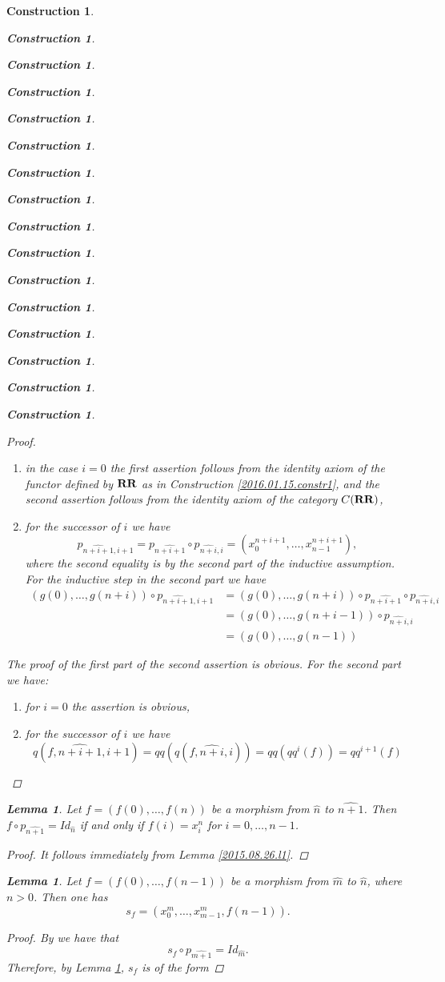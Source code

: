 \documentclass[onecolumn,12pt]{amsart}
\newtheorem{lemma}[proposition]{Lemma}
\numberwithin{proposition}{subsection}
\newtheorem{construction}[proposition]{Construction}
\newcommand{\wh}{\widehat}
\newcommand{\RR}{{\bf RR}}
\begin{document}
\begin{construction}
\begin{construction}
\begin{construction}
\begin{construction}
\begin{construction}
\begin{construction}
\begin{construction}
\begin{construction}
\begin{construction}
\begin{construction}
\begin{construction}
\begin{construction}
\begin{construction}
\begin{construction}
\begin{construction}
\begin{construction}
\begin{proof}
%
\begin{enumerate}
\item in the case $i=0$ the first assertion follows from the identity axiom of
  the functor defined by $\RR$ as in Construction \ref{2016.01.15.constr1}, and
  the second assertion follows from the identity axiom of the category $C(\RR)$,
\item for the successor of $i$ we have
%
$$p_{\wh{n+i+1},i+1}=p_{\wh{n+i+1}}\circ p_{\wh{n+i},i}=(x_0^{n+i+1},\dots,x_{n-1}^{n+i+1}),$$
%
where the second equality is by the second part of the inductive
assumption. For the inductive step in the second part we have
%
\begin{equation*}
  \begin{split}
    (g(0),\dots,g(n+i))\circ p_{\wh{n+i+1},i+1}&=(g(0),\dots,g(n+i))\circ p_{\wh{n+i+1}}\circ p_{\wh{n+i},i}
    \\&=
    (g(0),\dots,g(n+i-1))\circ p_{\wh{n+i},i}
    \\&=
    (g(0),\dots,g(n-1))
  \end{split}
\end{equation*}
%
\end{enumerate}
%
The proof of the first part of the second assertion is obvious. For the second
part we have:
%
\begin{enumerate}
\item for $i=0$ the assertion is obvious,
\item for the successor of $i$ we have 
%
$$q(f,\wh{n+i+1},i+1)=qq(q(f,\wh{n+i},i))=qq(qq^i(f))=qq^{i+1}(f)$$
%
\end{enumerate}
%
\end{proof}
%
\begin{lemma}
\label{2015.08.22.l7}
Let $f=(f(0),\dots,f(n))$ be a morphism from $\wh{n}$ to $\wh{n+1}$. Then
$f\circ p_{\wh{n+1}}=Id_{\wh{n}}$ if and only if $f(i)=x_i^{n}$ for
$i=0,\dots,n-1$.
\end{lemma}
%
\begin{proof}
It follows immediately from Lemma \ref{2015.08.26.l1}.
\end{proof}
%
\begin{lemma}
\label{2015.09.09.l1}
Let $f=(f(0),\dots,f(n-1))$ be a morphism from $\wh{m}$ to $\wh{n}$, where $n>0$. Then one has
%
\[s_f=(x_0^{m},\dots,x_{m-1}^{m},f(n-1)).\]
%
\end{lemma}
%
\begin{proof}
By \cite[Definition 2.3(2)]{Csubsystems} we have that 
%
\[s_f\circ p_{\wh{m+1}}=Id_{\wh{m}}.\]
%
Therefore, by Lemma \ref{2015.08.22.l7}, $s_f$ is of the form

\end{proof}
\end{construction}
\end{construction}
\end{construction}
\end{construction}
\end{construction}
\end{construction}
\end{construction}
\end{construction}
\end{construction}
\end{construction}
\end{construction}
\end{construction}
\end{construction}
\end{construction}
\end{construction}
\end{construction}
\end{document}
